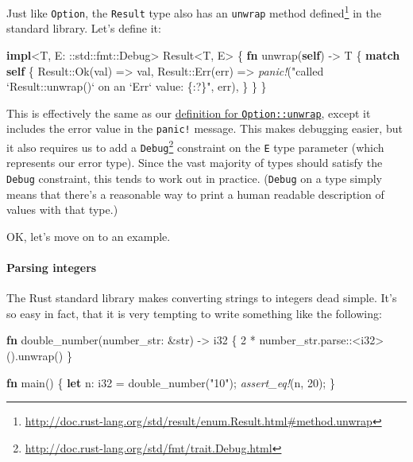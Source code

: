 \documentclass[a4paper,]{book}
\newenvironment{Shaded}{\begin{snugshade}}{\end{snugshade}}
\newcommand{\KeywordTok}[1]{\textcolor[rgb]{0.13,0.29,0.53}{\textbf{{#1}}}}
\newcommand{\DataTypeTok}[1]{\textcolor[rgb]{0.13,0.29,0.53}{{#1}}}
\newcommand{\DecValTok}[1]{\textcolor[rgb]{0.00,0.00,0.81}{{#1}}}
\newcommand{\ConstantTok}[1]{\textcolor[rgb]{0.00,0.00,0.00}{{#1}}}
\newcommand{\StringTok}[1]{\textcolor[rgb]{0.31,0.60,0.02}{{#1}}}
\newcommand{\BuiltInTok}[1]{{#1}}
\newcommand{\PreprocessorTok}[1]{\textcolor[rgb]{0.56,0.35,0.01}{\textit{{#1}}}}
\newcommand{\NormalTok}[1]{{#1}}
\renewcommand{\href}[2]{#2\footnote{\url{#1}}}
\let\oldparagraph\paragraph
\renewcommand{\paragraph}[1]{\oldparagraph{#1}\mbox{}}
\begin{document}
Just like \texttt{Option}, the \texttt{Result} type also has an
\href{http://doc.rust-lang.org/std/result/enum.Result.html\#method.unwrap}{\texttt{unwrap}
method defined} in the standard library. Let's define it:

\begin{Shaded}
\begin{Highlighting}[]
\KeywordTok{impl}\NormalTok{<T, E: ::std::fmt::}\BuiltInTok{Debug}\NormalTok{> }\DataTypeTok{Result}\NormalTok{<T, E> \{}
    \KeywordTok{fn} \NormalTok{unwrap(}\KeywordTok{self}\NormalTok{) -> T \{}
        \KeywordTok{match} \KeywordTok{self} \NormalTok{\{}
            \DataTypeTok{Result}\NormalTok{::}\ConstantTok{Ok}\NormalTok{(val) => val,}
            \DataTypeTok{Result}\NormalTok{::}\ConstantTok{Err}\NormalTok{(err) =>}
              \PreprocessorTok{panic!}\NormalTok{(}\StringTok{"called `Result::unwrap()` on an `Err` value: \{:?\}"}\NormalTok{, err),}
        \NormalTok{\}}
    \NormalTok{\}}
\NormalTok{\}}
\end{Highlighting}
\end{Shaded}

This is effectively the same as our
\protect\hyperlink{code-option-def-unwrap}{definition for
\texttt{Option::unwrap}}, except it includes the error value in the
\texttt{panic!} message. This makes debugging easier, but it also
requires us to add a
\href{http://doc.rust-lang.org/std/fmt/trait.Debug.html}{\texttt{Debug}}
constraint on the \texttt{E} type parameter (which represents our error
type). Since the vast majority of types should satisfy the
\texttt{Debug} constraint, this tends to work out in practice.
(\texttt{Debug} on a type simply means that there's a reasonable way to
print a human readable description of values with that type.)

OK, let's move on to an example.

\hypertarget{parsing-integers}{\paragraph{Parsing
integers}\label{parsing-integers}}

The Rust standard library makes converting strings to integers dead
simple. It's so easy in fact, that it is very tempting to write
something like the following:

\begin{Shaded}
\begin{Highlighting}[]
\KeywordTok{fn} \NormalTok{double_number(number_str: &}\DataTypeTok{str}\NormalTok{) -> }\DataTypeTok{i32} \NormalTok{\{}
    \DecValTok{2} \NormalTok{* number_str.parse::<}\DataTypeTok{i32}\NormalTok{>().unwrap()}
\NormalTok{\}}

\KeywordTok{fn} \NormalTok{main() \{}
    \KeywordTok{let} \NormalTok{n: }\DataTypeTok{i32} \NormalTok{= double_number(}\StringTok{"10"}\NormalTok{);}
    \PreprocessorTok{assert_eq!}\NormalTok{(n, }\DecValTok{20}\NormalTok{);}
\NormalTok{\}}
\end{Highlighting}
\end{Shaded}
\end{document}
